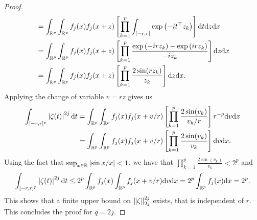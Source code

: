\begin{proof}
\begin{align*}
        &= \intRp{x}{\intRp{z}{f_j(x)f_j(x + z)\left[\prod_{k=1}^p \int_{[-r, r]}\expf{-it^\top z_k}\right]\d t}}\\
        &= \intRp{x}{\intRp{z}{f_j(x)f_j(x + z)\left[\prod_{k=1}^p \frac{\expf{-irz_k} - \expf{irz_k}}{-iz_k} \right]}}\\
        &= \intRp{x}{\intRp{z}{f_j(x)f_j(x + z)\left[\prod_{k=1}^p \frac{2 \sin(rz_k)}{z_k} \right]}}.
    \end{align*}
    Applying the change of variable $v = r z$ gives us
    \begin{align*}
        \int_{[-r, r]^p} \abs{\zeta(t)}^{2j} \d t
        &= \intRp{x}{\intRp{v}{f_j(x)f_j(x + v/r)\left[\prod_{k=1}^p \frac{2 \sin(v_k)}{v_k/r} \right] r^{-p}}}\\
        &= \intRp{x}{\intRp{v}{f_j(x)f_j(x + v/r)\left[\prod_{k=1}^p \frac{2 \sin(v_k)}{v_k} \right]}}.
    \end{align*}
    Using the fact that $\sup_{x \in \R} \abs{\sin x / x} < 1$, we have that $\prod_{k=1}^p \frac{2 \sin(v_k)}{v_k} < 2^p$ and
    \begin{equation*}
        \int_{[-r, r]^p} \abs{\zeta(t)}^{2j} \d t
        \leq 2^p \intRp{x}{f_j(x)\intRp{v}{f_j(x + v/r)}}
        = 2^p \intRp{x}{f_j(x)} = 2^p.
    \end{equation*}
    This shows that a finite upper bound on $\norm{\zeta}_{2j}^{2j}$ exists, that is independent of $r$. This concludes the proof for $q = 2j$.
\end{proof}